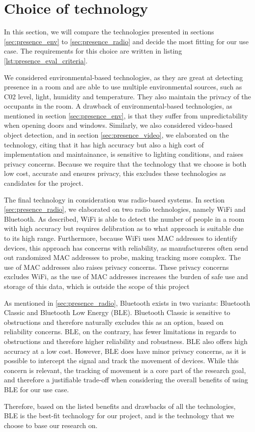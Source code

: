 \section{Choice of technology}
In this section, we will compare the technologies presented in sections \ref{sec:presence_env} to \ref{sec:presence_radio} and decide the most fitting for our use case. 
The requirements for this choice are written in listing \ref{lst:presence_eval_criteria}.

We considered environmental-based technologies, as they are great at detecting presence in a room and are able to use multiple environmental sources, such as C02 level, light, humidity and temperature. 
They also maintain the privacy of the occupants in the room. 
A drawback of environmental-based technologies, as mentioned in section \ref{sec:presence_env}, is that they suffer from unpredictability when opening doors and windows. 
Similarly, we also considered video-based object detection, and in section \ref{sec:presence_video}, we elaborated on the technology, citing that it has high accuracy but also a high cost of implementation and maintainance, is sensitive to lighting conditions, and raises privacy concerns.
Because we require that the technology that we choose is both low cost, accurate and ensures privacy, this excludes these technologies as candidates for the project.

The final technology in consideration was radio-based systems. In section \ref{sec:presence_radio}, we elaborated on two radio technologies, namely WiFi and Bluetooth. 
As described, WiFi is able to detect the number of people in a room with high accuracy but requires delibration as to what approach is suitable due to its high range. 
Furthermore, because WiFi uses MAC addresses to identify devices, this approach has concerns with reliability, as manufactureres often send out randomized MAC addresses to probe, making tracking more complex. 
The use of MAC addresses also raises privacy concerns. 
These privacy concerns excludes WiFi, as the use of MAC addresses increases the burden of safe use and storage of this data, which is outside the scope of this project

As mentioned in \ref{sec:presence_radio}, Bluetooth exists in two variants: Bluetooth Classic and Bluetooth Low Energy (BLE). Bluetooth Classic is sensitive to obstructions and therefore naturally excludes this as an option, based on reliability concerns. 
BLE, on the contrary, has fewer limitations in regards to obstructions and therefore higher reliability and robustness.
BLE also offers high accuracy at a low cost.
However, BLE does have minor privacy concerns, as it is possible to intercept the signal and track the movement of devices.
While this concern is relevant, the tracking of movement is a core part of the research goal, and therefore a justifiable trade-off when considering the overall benefits of using BLE for our use case.

Therefore, based on the listed benefits and drawbacks of all the technologies, BLE is the best-fit technology for our project, and is the technology that we choose to base our research on.